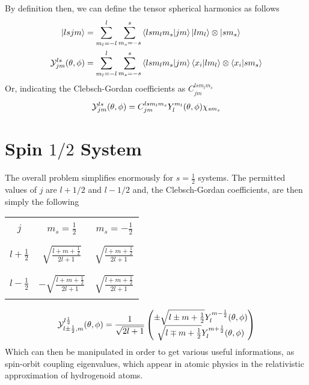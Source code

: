 \documentclass[../qm.tex]{subfiles}
\begin{document}
	By definition then, we can define the tensor spherical harmonics as follows
	\begin{equation}
		\begin{aligned}
			\ket{lsjm}&=\sum_{m_l=-l}^l\sum_{m_s=-s}^s\bra{lsm_lm_s}\ket{jm}\ket{lm_l}\otimes\ket{sm_s}\\
			\mathcal{Y}^{ls}_{jm}(\theta,\phi)&=\sum_{m_l=-l}^l\sum_{m_s=-s}^s\bra{lsm_lm_s}\ket{jm}\bra{x_i}\ket{lm_l}\otimes\bra{x_i}\ket{sm_s}
		\end{aligned}
		\label{eq:tsphdef}
	\end{equation}
	Or, indicating the Clebsch-Gordan coefficients as $C^{lsm_lm_s}_{jm}$
	\begin{equation*}
		\mathcal{Y}^{ls}_{jm}(\theta,\phi)=C^{lsm_lm_s}_{jm}Y^{m_l}_l(\theta,\phi)\chi_{sm_s}
	\end{equation*}
	\section{Spin $1/2$ System}
	The overall problem simplifies enormously for $s=\frac{1}{2}$ systems. The permitted values of $j$ are $l+1/2$ and $l-1/2$ and, the Clebsch-Gordan coefficients, are then simply the following
	\begin{table}[H]
		\centering
		\begin{tabular}{|c|c|c|}
			\hline
			&&\\
			$j$&$m_s=\tfrac{1}{2}$&$m_s=-\tfrac{1}{2}$\\
			&&\\
			\hline
			&&\\
			$l+\frac{1}{2}$&$\sqrt{\frac{l+m+\frac{1}{2}}{2l+1}}$&$\sqrt{\frac{l+m+\frac{1}{2}}{2l+1}}$\\
			&&\\
			\hline
			&&\\
			$l-\frac{1}{2}$&$-\sqrt{\frac{l+m+\frac{1}{2}}{2l+1}}$&$\sqrt{\frac{l+m+\frac{1}{2}}{2l+1}}$\\
			&&\\
			\hline
		\end{tabular}
	\end{table}
	\begin{equation}
		\mathcal{Y}^{l\frac{1}{2}}_{l\pm\frac{1}{2},m}(\theta,\phi)=\frac{1}{\sqrt{2l+1}}\begin{pmatrix}\pm\sqrt{l\pm m+\tfrac{1}{2}}Y_l^{m-\frac{1}{2}}(\theta,\phi)\\\sqrt{l\mp m+\tfrac{1}{2}}Y^{m+\frac{1}{2}}_l(\theta,\phi)\end{pmatrix}
		\label{eq:tensorsphericalharm}
	\end{equation}
	Which can then be manipulated in order to get various useful informations, as spin-orbit coupling eigenvalues, which appear in atomic physics in the relativistic approximation of hydrogenoid atoms.
\end{document}
